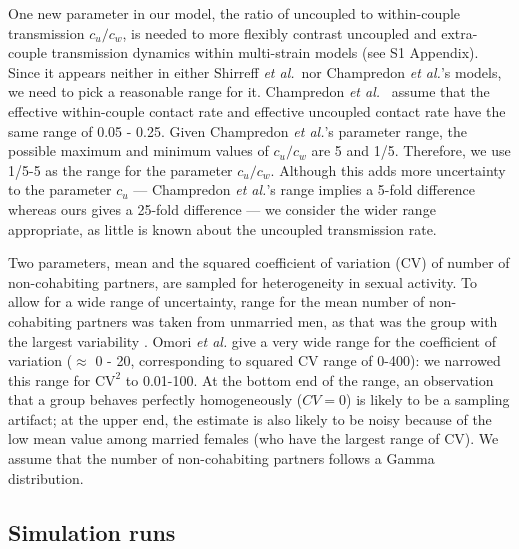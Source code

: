 \documentclass[10pt,letterpaper]{article}
\newcommand{\etal}{\textit{et al.}}
\begin{document}
One new parameter in our model, the ratio of uncoupled to within-couple transmission $c_u/c_w$, is needed to more flexibly contrast uncoupled and extra-couple transmission dynamics within multi-strain models (see S1 Appendix). Since it appears neither in either Shirreff \etal\ nor Champredon \etal's models,  we need to pick a reasonable range for it. Champredon \etal\ \cite{champredon_hiv_2013} assume that the effective within-couple contact rate and effective uncoupled contact rate have the same range of 0.05 - 0.25.  Given Champredon \etal's parameter range, the possible maximum and minimum values of $c_u/c_w$ are 5 and 1/5. Therefore, we use 1/5-5 as the range for the parameter $c_u/c_w$. Although this adds more uncertainty to the parameter $c_u$ --- Champredon \etal's range implies a 5-fold difference whereas ours gives a 25-fold difference --- we consider the wider range appropriate, as little is known about the uncoupled transmission rate.

Two parameters, mean and the squared coefficient of variation (CV) of number of non-cohabiting partners, are sampled for heterogeneity in sexual activity.
To allow for a wide range of uncertainty, range for the mean number of non-cohabiting partners was taken from unmarried men, as that was the group with the largest variability \cite{omori2015dynamics}. 
Omori \etal \cite{omori2015dynamics} give a very wide
range for the coefficient of variation ($\approx$ 0 - 20, corresponding
to squared CV range of 0-400):
we narrowed this range for $\textrm{CV}^2$ to 0.01-100.
At the bottom end of the range, an observation that a group behaves
perfectly homogeneously ($CV=0$) is likely to be a sampling artifact;
at the upper end, the estimate is also likely to be noisy because
of the low mean value among married females (who have the largest
range of CV). 
We assume that the number of non-cohabiting partners follows a Gamma distribution.

\subsection*{Simulation runs}
\end{document}
